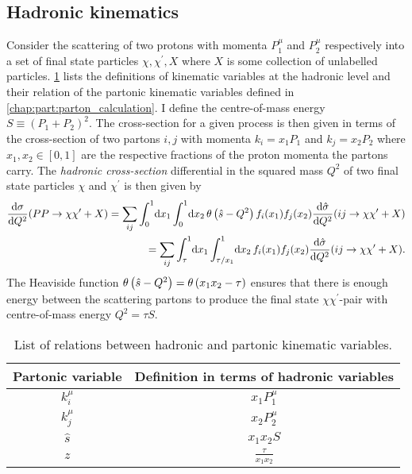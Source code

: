 \documentclass[../main.tex]{subfiles}
\begin{document}
\subsection{Hadronic kinematics}
Consider the scattering of two protons with momenta \(P_1^\mu\) and \(P_2^\mu\) respectively into a set of final state particles \(\chi, \chi^\prime, X\) where \(X\) is some collection of unlabelled particles.
\cref{had:tab:had_kinematic_variables} lists the definitions of kinematic variables at the hadronic level and their relation of the partonic kinematic variables defined in \cref{chap:part:parton_calculation}.
I define the centre-of-mass energy \(S \equiv (P_1 + P_2)^2\).
The cross-section for a given process is then given in terms of the cross-section of two partons \(i, j\) with momenta \(k_i = x_1 P_1\) and \(k_j = x_2 P_2\) where \(x_1, x_2 \in [0, 1]\) are the respective fractions of the proton momenta the partons carry.
The \emph{hadronic cross-section} differential in the squared mass \(Q^2\) of two final state particles \(\chi\) and \(\chi^\prime\) is then given by
\begin{align}
  \label{had:eq:dsigma_dQ2}
  \nonumber
  \d[Q^2]{\sigma}(PP \to \chi \chi^\prime + X) = \sum_ {ij} \integral[_0^1]{x_1}\!\integral[_0^1]{x_2} \theta\pclosed{\hat{s} - Q^2} f_i(x_1) f_j(x_2) \d[Q^2]{\hat\sigma}(ij \to \chi\chi^\prime + X) \\
  = \sum_ {ij} \integral[_\tau^1]{x_1}\!\integral[_{\tau/x_1}^1]{x_2} f_i(x_1) f_j(x_2) \d[Q^2]{\hat\sigma}(ij \to \chi\chi^\prime + X).
\end{align}
The Heaviside function \(\theta\left(\hat{s}-Q^2\right) = \theta\left(x_1 x_2 - \tau\right)\) ensures that there is enough energy between the scattering partons to produce the final state \(\chi \chi^\prime\)-pair with centre-of-mass energy \(Q^2 = \tau S\).

\begin{table}[ht!]
  \centering
  \begin{tabular}{|c|c|}
    \hline
    Partonic variable & Definition in terms of hadronic variables \\
    \hline
    \(k_i^\mu\)       & \(x_1 P_1^\mu\)                           \\
    \(k_j^\mu\)       & \(x_2 P_2^\mu\)                           \\
    \(\hat{s}\)       & \(x_1 x_2 S\)                             \\
    \(z\)             & \(\frac{\tau}{x_1x_2}\)                   \\
    \hline
  \end{tabular}
  \caption{List of relations between hadronic and partonic kinematic variables.}
  \label{had:tab:had_kinematic_variables}
\end{table}
\end{document}
